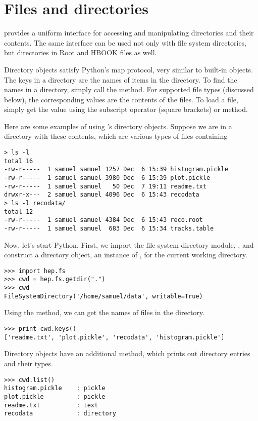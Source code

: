 \chapter{Files and directories}

\pyhep provides a uniform interface for accessing and manipulating
directories and their contents.  The same interface can be used not only
with file system directories, but directories in Root and HBOOK files as
well.  

Directory objects satisfy Python's map protocol, very similar to
built-in  objects.  The keys in a directory are the names of
items in the directory.  To find the names in a directory, simply call
the  method.  For supported file types (discussed below),
the corresponding values are the contents of the files.  To load a file,
simply get the value using the subscript operator (square brackets) or
 method.

Here are some examples of using \pyhep's directory objects.  Suppose we
are in a directory with these contents, which are various types of files
containing 
\begin{verbatim}
> ls -l
total 16
-rw-r-----  1 samuel samuel 1257 Dec  6 15:39 histogram.pickle
-rw-r-----  1 samuel samuel 3980 Dec  6 15:39 plot.pickle
-rw-r-----  1 samuel samuel   50 Dec  7 19:11 readme.txt
drwxr-x---  2 samuel samuel 4096 Dec  6 15:43 recodata
> ls -l recodata/
total 12
-rw-r-----  1 samuel samuel 4384 Dec  6 15:43 reco.root
-rw-r-----  1 samuel samuel  683 Dec  6 15:34 tracks.table
\end{verbatim}

Now, let's start Python.  First, we import the file system directory
module, , and construct a directory object, an instance
of , for the current working directory.
\begin{verbatim}
>>> import hep.fs
>>> cwd = hep.fs.getdir(".")
>>> cwd
FileSystemDirectory('/home/samuel/data', writable=True)
\end{verbatim}

Using the  method, we can get the names of files in the
directory.
\begin{verbatim}
>>> print cwd.keys()
['readme.txt', 'plot.pickle', 'recodata', 'histogram.pickle']
\end{verbatim}

Directory objects have an additional  method, which prints
out directory entries and their types.
\begin{verbatim}
>>> cwd.list()
histogram.pickle    : pickle
plot.pickle         : pickle
readme.txt          : text
recodata            : directory
\end{verbatim}

